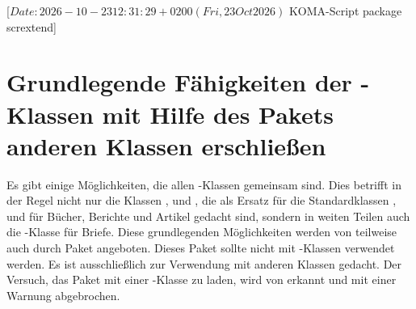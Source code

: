 %
%
%
%
%
%
%

                 [$Date: 2026-10-23 12:31:29 +0200 (Fri, 23 Oct 2026) $
                  KOMA-Script package scrextend]

\chapter[tocentry={Grundlegende Fähigkeiten der
  \KOMAScript-Klassen\protect\linebreak
  mit Hilfe des Pakets \Package{scrextend} anderen Klassen erschließen},
  head={Fähigkeiten von \KOMAScript-Klassen mit \Package{scrextend}}]
{Grundlegende Fähigkeiten der \KOMAScript-Klassen mit Hilfe des Pakets
   anderen Klassen erschließen}
\BeginIndexGroup
{}%

Es gibt einige Möglichkeiten, die allen \KOMAScript-Klassen gemeinsam
sind. Dies betrifft in der Regel nicht nur die Klassen ,
 und , die als Ersatz für die Standardklassen
,  und  für Bücher, Berichte und
Artikel gedacht sind, sondern in weiten Teilen auch die \KOMAScript-Klasse
 für Briefe. Diese grundlegenden Möglichkeiten werden von
\KOMAScript{} teilweise auch durch Paket 
angeboten. Dieses Paket sollte nicht mit
\KOMAScript-Klassen verwendet werden. Es ist ausschließlich zur Verwendung mit
anderen Klassen gedacht. Der Versuch, das Paket mit einer \KOMAScript-Klasse
zu laden, wird von  erkannt und mit einer Warnung
abgebrochen.

